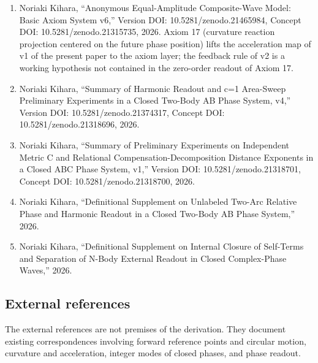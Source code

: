 \documentclass[
  a4paper,
]{article}
\providecommand{\tightlist}{%
  \setlength{\itemsep}{0pt}\setlength{\parskip}{0pt}}
\begin{document}
\begin{enumerate}
\def\labelenumi{\arabic{enumi}.}
\tightlist
\item
  Noriaki Kihara, ``Anonymous Equal-Amplitude Composite-Wave Model:
  Basic Axiom System v6,'' Version DOI: 10.5281/zenodo.21465984, Concept
  DOI: 10.5281/zenodo.21315735, 2026. Axiom 17 (curvature reaction
  projection centered on the future phase position) lifts the
  acceleration map of v1 of the present paper to the axiom layer; the
  feedback rule of v2 is a working hypothesis not contained in the
  zero-order readout of Axiom 17.
\item
  Noriaki Kihara, ``Summary of Harmonic Readout and c=1 Area-Sweep
  Preliminary Experiments in a Closed Two-Body AB Phase System, v4,''
  Version DOI: 10.5281/zenodo.21374317, Concept DOI:
  10.5281/zenodo.21318696, 2026.
\item
  Noriaki Kihara, ``Summary of Preliminary Experiments on Independent
  Metric C and Relational Compensation-Decomposition Distance Exponents
  in a Closed ABC Phase System, v1,'' Version DOI:
  10.5281/zenodo.21318701, Concept DOI: 10.5281/zenodo.21318700, 2026.
\item
  Noriaki Kihara, ``Definitional Supplement on Unlabeled Two-Arc
  Relative Phase and Harmonic Readout in a Closed Two-Body AB Phase
  System,'' 2026.
\item
  Noriaki Kihara, ``Definitional Supplement on Internal Closure of
  Self-Terms and Separation of N-Body External Readout in Closed
  Complex-Phase Waves,'' 2026.
\end{enumerate}

\subsection{External references}\label{external-references}

The external references are not premises of the derivation. They
document existing correspondences involving forward reference points and
circular motion, curvature and acceleration, integer modes of closed
phases, and phase readout.
\end{document}
